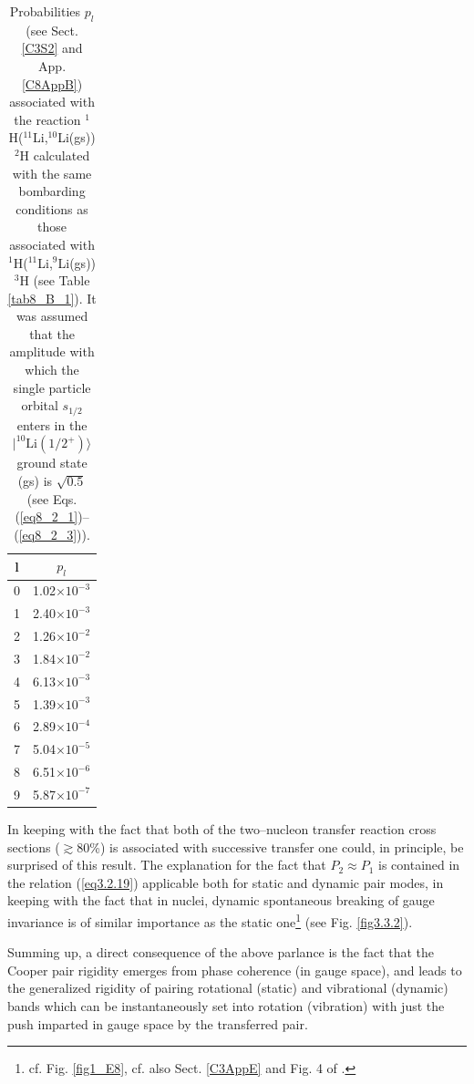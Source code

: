   \begin{table}
  \begin{tabular}{|c|c|}
  \hline  l & $p_l$ \\ 
\hline  0 & 1.02$\times 10^{-3}$ \\ 
\hline  1 & 2.40$\times 10^{-3}$ \\ 
\hline  2 &  1.26$\times 10^{-2}$ \\ 
\hline  3 &  1.84$\times 10^{-2}$ \\ 
\hline  4 &  6.13$\times 10^{-3}$\\ 
\hline  5 &  1.39$\times 10^{-3}$\\ 
\hline  6 &  2.89$\times 10^{-4}$\\ 
\hline  7 &  5.04$\times 10^{-5}$\\ 
\hline  8 &  6.51$\times 10^{-6}$\\ 
\hline  9 &  5.87$\times 10^{-7}$\\
\hline
  \end{tabular}\caption{Probabilities $p_l$ (see Sect. \ref{C3S2} and App. \ref{C8AppB}) associated with the reaction $^1$H($^{11}$Li,$^{10}$Li(gs))$^2$H calculated with the same bombarding conditions as those associated with $^1$H($^{11}$Li,$^{9}$Li(gs))$^3$H (see Table \ref{tab8_B_1}). It was assumed that the amplitude with which the single particle orbital $s_{1/2}$ enters in the $|^{10}\text{Li}(1/2^+)\rangle$ ground state (gs) is $\sqrt{0.5}$ (see Eqs. (\ref{eq8_2_1})--(\ref{eq8_2_3})).}\label{tab3.3.1}
  \end{table}

In keeping with the fact that both of the two--nucleon transfer reaction cross sections ($\gtrsim 80$\%) is associated with successive transfer one could, in principle, be surprised of this result. The explanation for the fact that $P_2\approx P_1$ is contained in the relation (\ref{eq3.2.19}) applicable both for static and dynamic pair modes, in keeping with the fact that in nuclei, dynamic spontaneous breaking of gauge invariance is of similar importance as the static one\footnote{cf. Fig. \ref{fig1_E8}, cf. also Sect. \ref{C3AppE} and Fig. 4 of \cite{Potel:13b}.} (see Fig. \ref{fig3.3.2}). 


Summing up, a direct consequence of the above parlance is the fact that the Cooper pair rigidity emerges from phase coherence (in gauge space), and leads to the generalized rigidity of pairing rotational (static) and vibrational (dynamic) bands which can be instantaneously set into rotation (vibration) with just the push imparted in gauge space by the transferred pair.






